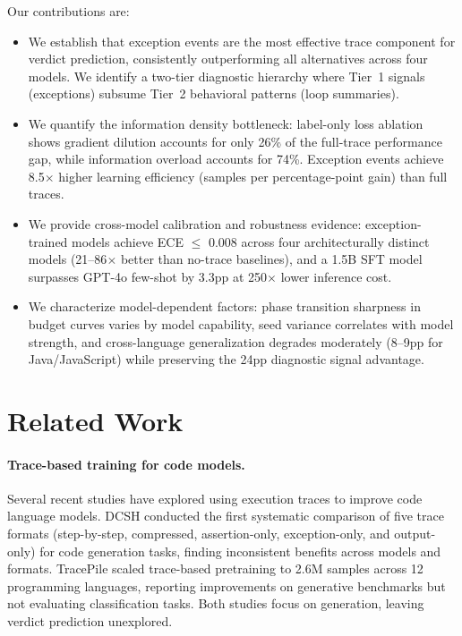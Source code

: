 \documentclass[11pt,a4paper]{article}
\begin{document}
Our contributions are:
\begin{itemize}
\item We establish that exception events are the most effective trace component for verdict prediction, consistently outperforming all alternatives across four models. We identify a two-tier diagnostic hierarchy where Tier~1 signals (exceptions) subsume Tier~2 behavioral patterns (loop summaries).
\item We quantify the information density bottleneck: label-only loss ablation shows gradient dilution accounts for only 26\% of the full-trace performance gap, while information overload accounts for 74\%. Exception events achieve 8.5$\times$ higher learning efficiency (samples per percentage-point gain) than full traces.
\item We provide cross-model calibration and robustness evidence: exception-trained models achieve ECE $\leq$ 0.008 across four architecturally distinct models (21--86$\times$ better than no-trace baselines), and a 1.5B SFT model surpasses GPT-4o few-shot by 3.3pp at 250$\times$ lower inference cost.
\item We characterize model-dependent factors: phase transition sharpness in budget curves varies by model capability, seed variance correlates with model strength, and cross-language generalization degrades moderately (8--9pp for Java/JavaScript) while preserving the 24pp diagnostic signal advantage.
\end{itemize}

\section{Related Work}

\paragraph{Trace-based training for code models.}
Several recent studies have explored using execution traces to improve code language models. DCSH \cite{dcsh2025} conducted the first systematic comparison of five trace formats (step-by-step, compressed, assertion-only, exception-only, and output-only) for code generation tasks, finding inconsistent benefits across models and formats. TracePile \cite{tracepile2025} scaled trace-based pretraining to 2.6M samples across 12 programming languages, reporting improvements on generative benchmarks but not evaluating classification tasks. Both studies focus on generation, leaving verdict prediction unexplored.
\end{document}
